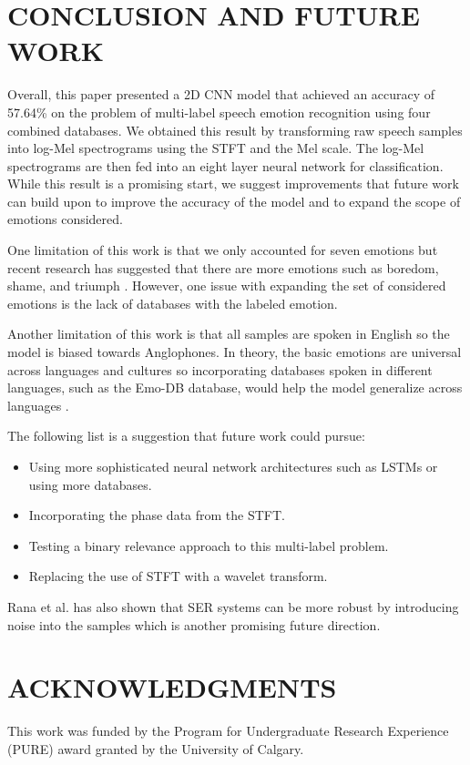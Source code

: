 \documentclass[a4paper, 10pt, conference]{ieeeconf}      %
\begin{document}
\section{CONCLUSION AND FUTURE WORK}

Overall, this paper presented a 2D CNN model that achieved an accuracy of 57.64\% on the problem of multi-label speech emotion recognition using four combined databases. We obtained this result by transforming raw speech samples into log-Mel spectrograms using the STFT and the Mel scale. The log-Mel spectrograms are then fed into an eight layer neural network for classification. While this result is a promising start, we suggest improvements that future work can build upon to improve the accuracy of the model and to expand the scope of emotions considered.

One limitation of this work is that we only accounted for seven emotions but recent research has suggested that there are more emotions such as boredom, shame, and triumph \cite{Cordaro2018}. However, one issue with expanding the set of considered emotions is the lack of databases with the labeled emotion.

Another limitation of this work is that all samples are spoken in English so the model is biased towards Anglophones. In theory, the basic emotions are universal across languages and cultures so incorporating databases spoken in different languages, such as the Emo-DB database, would help the model generalize across languages \cite{Burkhardt2005}.

The following list is a suggestion that future work could pursue:
\begin{itemize}
	\item Using more sophisticated neural network architectures such as LSTMs or using more databases.
	\item Incorporating the phase data from the STFT.
	\item Testing a binary relevance approach to this multi-label problem.
	\item Replacing the use of STFT with a wavelet transform.
\end{itemize}
Rana et al. \cite{Rana2016} has also shown that SER systems can be more robust by introducing noise into the samples which is another promising future direction.
 

\section{ACKNOWLEDGMENTS}

This work was funded by the Program for Undergraduate Research Experience (PURE) award granted by the University of Calgary.




\end{document}
